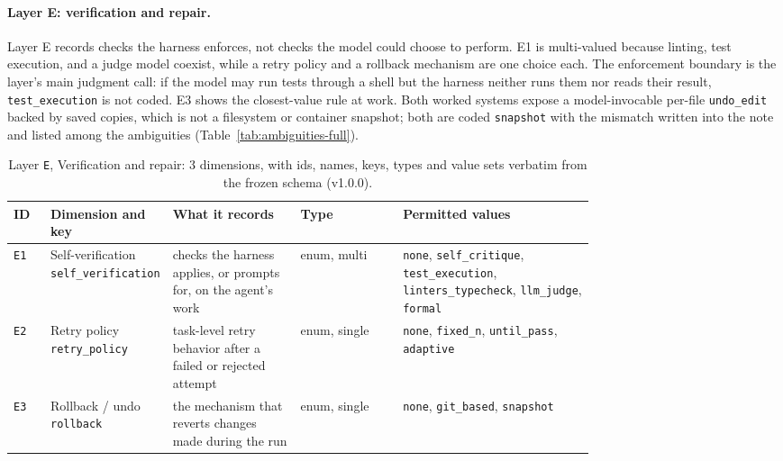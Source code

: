 \paragraph{Layer E: verification and repair.}\label{subsec:layer-e}
Layer E records checks the harness enforces, not checks the model could choose to perform. E1 is
multi-valued because linting, test execution, and a judge model coexist, while a retry policy and a
rollback mechanism are one choice each. The enforcement boundary is the layer's main judgment call: if
the model may run tests through a shell but the harness neither runs them nor reads their result,
\texttt{test\_execution} is not coded. E3 shows the closest-value rule at work. Both worked systems
expose a model-invocable per-file \texttt{undo\_edit} backed by saved copies, which is not a filesystem
or container snapshot; both are coded \texttt{snapshot} with the mismatch written into the note and
listed among the ambiguities (Table~\ref{tab:ambiguities-full}).

\begin{table}[htbp]
\caption{Layer \texttt{E}, Verification and repair: 3 dimensions, with ids, names, keys, types and value
sets verbatim from the frozen schema (v1.0.0).}
\label{tab:coding-E}
\footnotesize
\begin{tabular}{@{}l p{0.20\linewidth} p{0.22\linewidth} l p{0.33\linewidth}@{}}
\toprule
ID & Dimension and key & What it records & Type & Permitted values \tabularnewline
\midrule
\texttt{E1} & \raggedright Self-verification \newline \texttt{self\_verification} & \raggedright checks the harness applies, or prompts for, on the agent's work & enum, multi & \raggedright \texttt{none}, \texttt{self\_critique}, \texttt{test\_execution}, \texttt{linters\_typecheck}, \texttt{llm\_judge}, \texttt{formal} \tabularnewline
\texttt{E2} & \raggedright Retry policy \newline \texttt{retry\_policy} & \raggedright task-level retry behavior after a failed or rejected attempt & enum, single & \raggedright \texttt{none}, \texttt{fixed\_n}, \texttt{until\_pass}, \texttt{adaptive} \tabularnewline
\texttt{E3} & \raggedright Rollback / undo \newline \texttt{rollback} & \raggedright the mechanism that reverts changes made during the run & enum, single & \raggedright \texttt{none}, \texttt{git\_based}, \texttt{snapshot} \tabularnewline
\bottomrule
\end{tabular}
\end{table}

